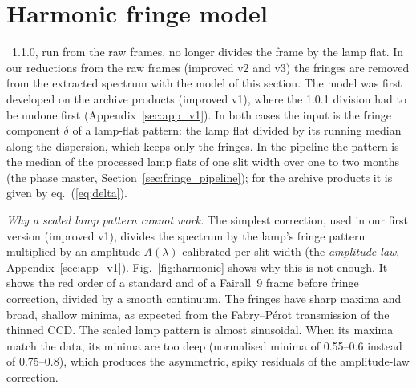 \section{Harmonic fringe model}
\label{sec:fringe_harmonic}
\banzai{}~1.1.0, run from the raw frames, no longer divides the frame by the lamp flat. In our reductions from the
raw frames (improved v2 and v3) the fringes are removed from the extracted spectrum with the model of this section. The model was first developed on the archive
products (improved v1), where the 1.0.1 division had to be undone first (Appendix~\ref{sec:app_v1}). In both cases
the input is the fringe component $\delta$ of a lamp-flat pattern: the lamp flat divided by its running median along
the dispersion, which keeps only the fringes. In the pipeline the pattern is the median of the processed lamp flats
of one slit width over one to two months (the phase master, Section~\ref{sec:fringe_pipeline}); for the archive
products it is given by eq.~(\ref{eq:delta}).

\textit{Why a scaled lamp pattern cannot work.} The simplest correction, used in our first version (improved v1),
divides the spectrum by the lamp's fringe pattern multiplied by an amplitude $A(\lambda)$ calibrated per slit width
(the \emph{amplitude law}, Appendix~\ref{sec:app_v1}). Fig.~\ref{fig:harmonic} shows why this is not enough. It
shows the red order of a standard and of a Fairall~9 frame before fringe correction, divided by a smooth continuum.
The fringes have sharp maxima and broad, shallow minima, as expected from the Fabry--P\'erot transmission of the
thinned CCD. The scaled lamp pattern is almost sinusoidal. When its maxima match the data, its minima are too deep
(normalised minima of 0.55--0.6 instead of 0.75--0.8), which produces the asymmetric, spiky residuals of the
amplitude-law correction.


